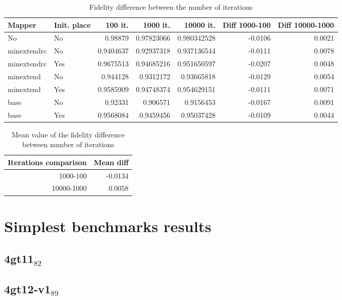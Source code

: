 \documentclass[11pt]{article}
\begin{document}
\begin{table}[!htpb]
\caption{\label{tab:org72083c8}
Fidelity difference between the number of iterations}
\centering
\begin{tabular}{llrrrrr}
\hline
Mapper & Init. place & 100 it. & 1000 it. & 10000 it. & Diff 1000-100 & Diff 10000-1000\\
\hline
No & No & 0.98879 & 0.97823066 & 0.980342528 & -0.0106 & 0.0021\\
\hline
minextendrc & No & 0.9404637 & 0.92937318 & 0.937136544 & -0.0111 & 0.0078\\
minextendrc & Yes & 0.9675513 & 0.94685216 & 0.951650597 & -0.0207 & 0.0048\\
minextend & No & 0.944128 & 0.9312172 & 0.93665818 & -0.0129 & 0.0054\\
minextend & Yes & 0.9585909 & 0.94748374 & 0.954629151 & -0.0111 & 0.0071\\
base & No & 0.92331 & 0.906571 & 0.9156453 & -0.0167 & 0.0091\\
base & Yes & 0.9568084 & 0.9459456 & 0.95037428 & -0.0109 & 0.0044\\
\hline
\end{tabular}
\end{table}

\begin{table}[!htpb]
\caption{\label{tab:org57297e4}
Mean value of the fidelity difference between number of iterations}
\centering
\begin{tabular}{rr}
\hline
Iterations comparison & Mean diff\\
\hline
1000-100 & -0.0134\\
10000-1000 & 0.0058\\
\hline
\end{tabular}
\end{table}






\section{Simplest benchmarks results}
\label{sec:orgb2757a6}

\subsection{4gt11\(_{\text{82}}\)}
\label{sec:org0335f0b}

\subsection{4gt12-v1\(_{\text{89}}\)}
\label{sec:org4289702}
\end{document}

